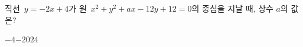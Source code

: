 직선~$y=-2x+4$가 원~$x^2+y^2+ax-12y+12=0$의 중심을 지날 때, 상수 $a$의 값은?
\begin{choices32}{$-4$}{$-2$}{$0$}{$2$}{$4$}\end{choices32}
